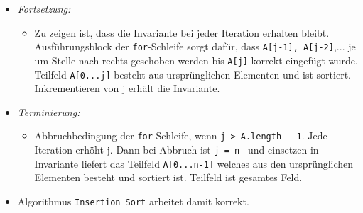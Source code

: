\documentclass[
    ngerman,
    color=3b,
    load_common, %
    summary,
    boxarc,
]{tuda_summary}
\begin{document}
\begin{itemize}
\begin{itemize}
              \item \textit{Fortsetzung:}
                    \begin{itemize}
                        \item   Zu zeigen ist, dass die Invariante bei jeder Iteration erhalten bleibt. Ausführungsblock der \texttt{for}-Schleife
                              sorgt dafür, dass \texttt{A[j-1], A[j-2]},... je um Stelle nach rechts geschoben werden bis \texttt{A[j]} korrekt eingefügt wurde.
                              Teilfeld \texttt{A[0...j]} besteht aus ursprünglichen Elementen und ist sortiert. Inkrementieren von j erhält die Invariante.
                    \end{itemize}

              \item \textit{Terminierung: }
                    \begin{itemize}
                        \item   Abbruchbedingung der \texttt{for}-Schleife, wenn \texttt{j > A.length - 1}. Jede Iteration erhöht j.
                              Dann bei Abbruch ist \texttt{j = n } und einsetzen in Invariante liefert das Teilfeld \texttt{A[0...n-1]}
                              welches aus den ursprünglichen Elementen besteht und sortiert ist. Teilfeld ist gesamtes Feld.
                    \end{itemize}

              \item Algorithmus \texttt{Insertion Sort} arbeitet damit korrekt.


\end{itemize}
\end{itemize}
\end{document}
